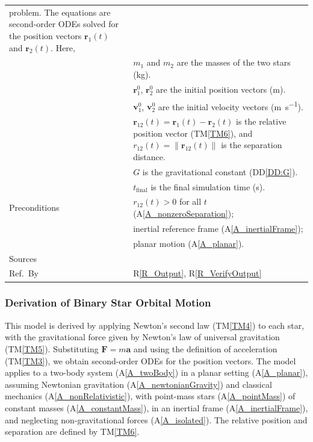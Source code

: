 \documentclass[12pt]{article}
\newcommand{\colAwidth}{0.13\textwidth}
\newcommand{\colBwidth}{0.82\textwidth}
\newcommand{\ddref}[1]{DD\ref{#1}}
\newcommand{\tref}[1]{TM\ref{#1}}
\newcommand{\aref}[1]{A\ref{#1}}
\newcommand{\rref}[1]{R\ref{#1}}
\begin{document}
\begin{minipage}{\textwidth}
\begin{tabular}{| p{\colAwidth} | p{\colBwidth}|}
  problem. The equations are second-order ODEs solved for the position vectors
  $\mathbf{r}_1(t)$ and $\mathbf{r}_2(t)$. Here,\\
  &
  $m_1$ and $m_2$ are the masses of the two stars (\si{\kilogram}). \\
  &
  $\mathbf{r}_1^0$, $\mathbf{r}_2^0$ are the initial position vectors
  (\si{\metre}). \\
  &
  $\mathbf{v}_1^0$, $\mathbf{v}_2^0$ are the initial velocity vectors
  (\si{\metre\per\second}). \\
  &
  $\mathbf{r}_{12}(t) = \mathbf{r}_1(t) - \mathbf{r}_2(t)$ is the relative
  position vector (\tref{TM6}), and
  $r_{12}(t)=\lVert\mathbf{r}_{12}(t)\rVert$ is the separation distance. \\
  &
  $G$ is the gravitational constant (\ddref{DD:G}). \\
  &
  $t_\text{final}$ is the final simulation time (\si{\second}). \\
  \hline
  Preconditions &
  $r_{12}(t) > 0$ for all $t$ (\aref{A_nonzeroSeparation}); \\
  &
  inertial reference frame (\aref{A_inertialFrame}); \\
  &
  planar motion (\aref{A_planar}). \\
  \hline
  Sources & \citep{Taylor2005} \\
  \hline
  Ref.\ By & \rref{R_Output}, \rref{R_VerifyOutput} \\
  \hline
\end{tabular}
\end{minipage}


\subsubsection*{Derivation of Binary Star Orbital Motion}

This model is derived by applying Newton's second law (\tref{TM4}) to each star,
with the gravitational force given by Newton's law of universal gravitation
(\tref{TM5}). Substituting $\mathbf{F}=m\mathbf{a}$ and using the definition of
acceleration (\tref{TM3}), we obtain second-order ODEs for the position vectors.
The model applies to a two-body system (\aref{A_twoBody}) in a planar setting
(\aref{A_planar}), assuming Newtonian gravitation (\aref{A_newtonianGravity})
and classical mechanics (\aref{A_nonRelativistic}), with point-mass stars
(\aref{A_pointMass}) of constant masses (\aref{A_constantMass}), in an inertial
frame (\aref{A_inertialFrame}), and neglecting non-gravitational forces
(\aref{A_isolated}). The relative position and separation are defined by
\tref{TM6}.
\end{document}

